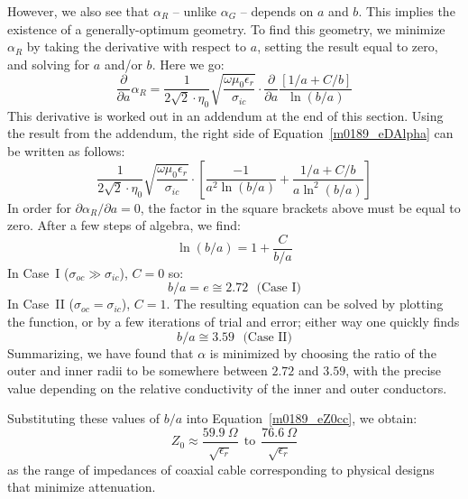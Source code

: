 However, we also see that $\alpha_R$ -- unlike $\alpha_G$ -- depends on $a$ and $b$.  
This implies the existence of a generally-optimum geometry.
To find this geometry, we minimize $\alpha_R$ by taking the derivative with respect to $a$, setting the result equal to zero, and solving for $a$ and/or $b$.  Here we go:
%
\begin{equation}
\frac{\partial}{\partial a}\alpha_R 
= \frac{1}{2\sqrt{2}\cdot\eta_0} \sqrt{\frac{\omega\mu_0 \epsilon_r}{\sigma_{ic}}} \cdot \frac{\partial}{\partial a} \frac{\left[ 1/a + C/b \right] }{  \ln\left(b/a\right) }
\label{m0189_eDAlpha}
\end{equation}
%
This derivative is worked out in an addendum at the end of this section.  
Using the result from the addendum, the right side of Equation~\ref{m0189_eDAlpha} can be written as follows:
%
\begin{equation}
\frac{1}{2\sqrt{2}\cdot\eta_0} \sqrt{\frac{\omega\mu_0 \epsilon_r}{\sigma_{ic}}} \cdot \left[ \frac{-1}{a^2 \ln\left(b/a\right) } + \frac{ 1/a + C/b }{a \ln^2\left(b/a\right) } \right]
\label{m0189_eDAlpha2}
\end{equation}
%
In order for $\partial\alpha_R/\partial a=0$, the factor in the square brackets above must be equal to zero.  After a few steps of algebra, we find:
%
\begin{equation}
\ln\left(b/a\right) = 1+\frac{C}{b/a}
\end{equation}
%
In Case~I ($\sigma_{oc} \gg \sigma_{ic}$), $C=0$ so: 
%
\begin{equation}
b/a=e\cong 2.72 ~~~ \mbox{(Case I)} 
\end{equation}
%
In Case~II ($\sigma_{oc} = \sigma_{ic}$), $C=1$. The resulting equation can be solved by plotting the function, or by a few iterations of trial and error; either way one quickly finds
%
\begin{equation} 
b/a\cong 3.59   ~~~ \mbox{(Case II)} 
\end{equation}
%
Summarizing, we have found that $\alpha$ is minimized by choosing the ratio of the outer and inner radii to be somewhere between $2.72$ and $3.59$, with the precise value depending on the relative conductivity of the inner and outer conductors.

Substituting these values of $b/a$ into Equation~\ref{m0189_eZ0cc}, we obtain:
%
\begin{equation}
Z_0 \approx \frac{59.9~\Omega}{\sqrt{\epsilon_r}} ~~\mbox{to}~~ \frac{76.6~\Omega}{\sqrt{\epsilon_r}} 
\label{m0189_eZ0Opt}
\end{equation}
%
as the range of impedances of coaxial cable corresponding to physical designs that minimize attenuation. 

